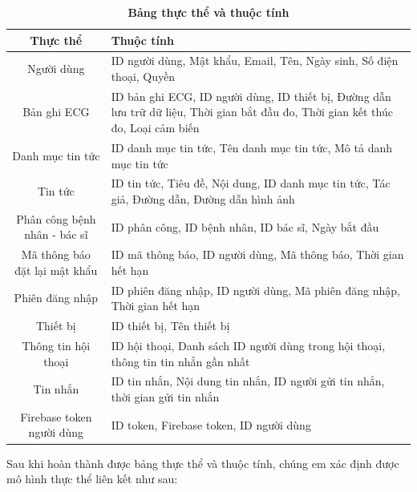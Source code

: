 \begin{table}[H]
  \caption{\bfseries \fontsize{12pt}{0pt}\selectfont Bảng thực thể và thuộc tính}
  \centering
  \begin{tabularx}{0.9\textwidth}{|c|X|}
    \hline
    \textbf{Thực thể} & \textbf{Thuộc tính} \\
    \hline
    Người dùng & 
    ID người dùng, Mật khẩu, Email, Tên, Ngày sinh, Số điện thoại, Quyền \\
    \hline
    Bản ghi ECG & 
    ID bản ghi ECG, ID người dùng, ID thiết bị, Đường dẫn lưu trữ dữ liệu, Thời gian bắt đầu đo, Thời gian kết thúc đo, Loại cảm biến \\
    \hline
    Danh mục tin tức & 
    ID danh mục tin tức, Tên danh mục tin tức, Mô tả danh mục tin tức \\
    \hline
    Tin tức & 
    ID tin tức, Tiêu đề, Nội dung, ID danh mục tin tức, Tác giả, Đường dẫn, Đường dẫn hình ảnh \\
    \hline
    Phân công bệnh nhân - bác sĩ & 
    ID phân công, ID bệnh nhân, ID bác sĩ, Ngày bắt đầu \\
    \hline
    Mã thông báo đặt lại mật khẩu & 
    ID mã thông báo, ID người dùng, Mã thông báo, Thời gian hết hạn \\
    \hline
    Phiên đăng nhập & 
    ID phiên đăng nhập, ID người dùng, Mã phiên đăng nhập, Thời gian hết hạn \\
    \hline
    Thiết bị & 
    ID thiết bị, Tên thiết bị \\
    \hline
    Thông tin hội thoại & 
    ID hội thoại, Danh sách ID người dùng trong hội thoại, thông tin tin nhắn gần nhất \\
    \hline
    Tin nhắn & 
    ID tin nhắn, Nội dung tin nhắn, ID người gửi tin nhắn, thời gian gửi tin nhắn \\
    \hline
    Firebase token người dùng & 
    ID token, Firebase token, ID người dùng \\
    \hline
  \end{tabularx}

  
\end{table}
Sau khi hoàn thành được bảng thực thể và thuộc tính, chúng em xác định được mô hình thực thể liên kết như sau:

